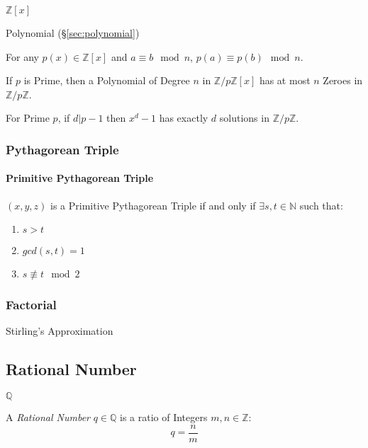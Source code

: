 $\mathbb{Z}[x]$

Polynomial (\S\ref{sec:polynomial})

For any $p(x) \in \mathbb{Z}[x]$ and $a \equiv b \mod n$, $p(a) \equiv
p(b) \mod n$.

If $p$ is Prime, then a Polynomial of Degree $n$ in
$\mathbb{Z}/p\mathbb{Z}[x]$ has at most $n$ Zeroes in
$\mathbb{Z}/p\mathbb{Z}$.

For Prime $p$, if $d|p-1$ then $x^d - 1$ has exactly $d$ solutions in
$\mathbb{Z}/p\mathbb{Z}$.



\subsubsection{Pythagorean Triple}\label{sec:pythagorean_triple}

\paragraph{Primitive Pythagorean Triple}\label{sec:primitive_pythagorean}\hfill

$(x,y,z)$ is a Primitive Pythagorean Triple if and only if $\exists
s,t \in \mathbb{N}$ such that:
\begin{enumerate}
  \item $s > t$
  \item $gcd (s,t) = 1$
  \item $s \not\equiv t \mod 2$
\end{enumerate}



\subsubsection{Factorial}\label{sec:factorial}

Stirling's Approximation



\subsection{Rational Number}\label{sec:rational}

$\mathbb{Q}$

A \emph{Rational Number} $q \in \mathbb{Q}$ is a ratio of Integers
$m,n \in \mathbb{Z}$:
\[
  q = \frac{n}{m}
\]

